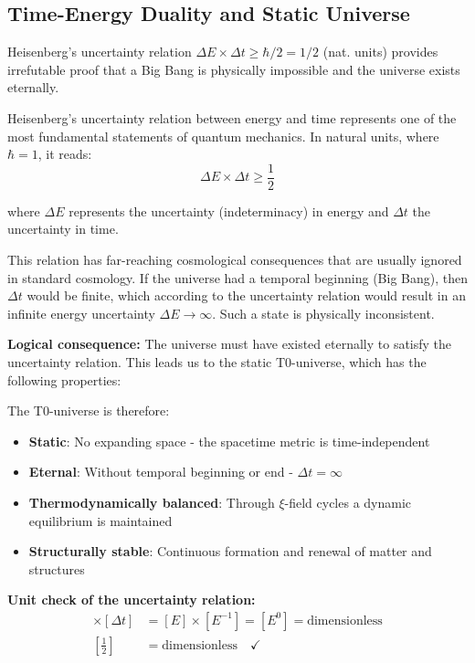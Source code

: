 \documentclass[12pt,a4paper]{article}
\theoremstyle{definition}
\theoremstyle{remark}
\begin{document}
	\subsection{Time-Energy Duality and Static Universe}
	
	\begin{important}
		Heisenberg's uncertainty relation $\Delta E \times \Delta t \geq \hbar/2 = 1/2$ (nat. units) provides irrefutable proof that a Big Bang is physically impossible and the universe exists eternally.
	\end{important}
	
	Heisenberg's uncertainty relation between energy and time represents one of the most fundamental statements of quantum mechanics. In natural units, where $\hbar = 1$, it reads:
	\begin{equation}
		\Delta E \times \Delta t \geq \frac{1}{2}
	\end{equation}
	
	where $\Delta E$ represents the uncertainty (indeterminacy) in energy and $\Delta t$ the uncertainty in time.
	
	This relation has far-reaching cosmological consequences that are usually ignored in standard cosmology. If the universe had a temporal beginning (Big Bang), then $\Delta t$ would be finite, which according to the uncertainty relation would result in an infinite energy uncertainty $\Delta E \to \infty$. Such a state is physically inconsistent.
	
	\textbf{Logical consequence:} The universe must have existed eternally to satisfy the uncertainty relation. This leads us to the static T0-universe, which has the following properties:
	
	The T0-universe is therefore:
	\begin{itemize}
		\item \textbf{Static}: No expanding space - the spacetime metric is time-independent
		\item \textbf{Eternal}: Without temporal beginning or end - $\Delta t = \infty$
		\item \textbf{Thermodynamically balanced}: Through $\xi$-field cycles a dynamic equilibrium is maintained
		\item \textbf{Structurally stable}: Continuous formation and renewal of matter and structures
	\end{itemize}
	
	\textbf{Unit check of the uncertainty relation:}
	\begin{align}
		[\Delta E] \times [\Delta t] &= [E] \times [E^{-1}] = [E^0] = \text{dimensionless} \\
		\left[\frac{1}{2}\right] &= \text{dimensionless} \quad \checkmark
	\end{align}
	
\end{document}
